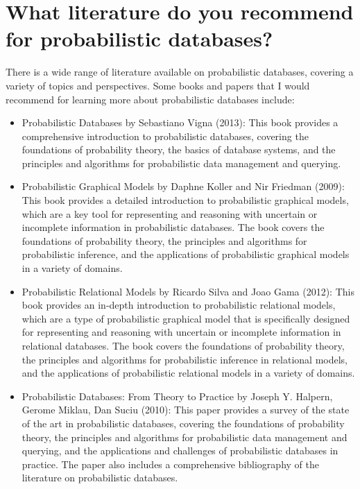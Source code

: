 \chapter{What literature do you recommend for probabilistic databases?}
There is a wide range of literature available on probabilistic databases, covering a variety of topics and perspectives. Some books and papers that I would recommend for learning more about probabilistic databases include:


\begin{itemize}
	\item Probabilistic Databases by Sebastiano Vigna (2013): This book provides a comprehensive introduction to probabilistic databases, covering the foundations of probability theory, the basics of database systems, and the principles and algorithms for probabilistic data management and querying.
	
	\item Probabilistic Graphical Models by Daphne Koller and Nir Friedman (2009): This book provides a detailed introduction to probabilistic graphical models, which are a key tool for representing and reasoning with uncertain or incomplete information in probabilistic databases. The book covers the foundations of probability theory, the principles and algorithms for probabilistic inference, and the applications of probabilistic graphical models in a variety of domains.
	
	\item Probabilistic Relational Models by Ricardo Silva and Joao Gama (2012): This book provides an in-depth introduction to probabilistic relational models, which are a type of probabilistic graphical model that is specifically designed for representing and reasoning with uncertain or incomplete information in relational databases. The book covers the foundations of probability theory, the principles and algorithms for probabilistic inference in relational models, and the applications of probabilistic relational models in a variety of domains.
	
	
	\item Probabilistic Databases: From Theory to Practice by Joseph Y. Halpern, Gerome Miklau, Dan Suciu (2010): This paper provides a survey of the state of the art in probabilistic databases, covering the foundations of probability theory, the principles and algorithms for probabilistic data management and querying, and the applications and challenges of probabilistic databases in practice. The paper also includes a comprehensive bibliography of the literature on probabilistic databases.
	
	

\end{itemize}